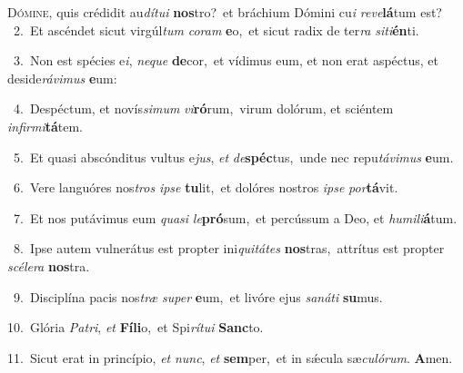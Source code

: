 \lettrine{\initial\textcolor{\initialcolor}{D}}{ómine,} quis crédidit au\-\textit{dí}\-\textit{tu}\textit{i} \textbf{nos}\-tro?~\star et bráchium Dómini cu\textit{i} \textit{re}\-\textit{ve}\textbf{lá}tum est?\\
{\numbfont\textcolor{\numbcolor}{~2.}}~Et ascéndet sicut virgúl\textit{tum} \textit{co}\-\textit{ram} \textbf{e}\-o,~\star et sicut radix de ter\textit{ra} \textit{si}\-\textit{ti}\textbf{én}ti.\par
{\numbfont\textcolor{\numbcolor}{~3.}}~Non est spécies e\-\textit{i}\-, \textit{ne}\-\textit{que} \textbf{de}\-cor,~\star et vídimus eum, et non erat aspéctus, et deside\-\textit{rá}\-\textit{vi}\textit{mus} \textbf{e}\-um:\par
{\numbfont\textcolor{\numbcolor}{~4.}}~Despéctum, et novís\-\textit{si}\-\textit{mum} \textit{vi}\-\textbf{ró}rum,~\star virum dolórum, et sciéntem \textit{in}\-\textit{fir}\textit{mi}\textbf{tá}tem.\par
{\numbfont\textcolor{\numbcolor}{~5.}}~Et quasi abscónditus vultus e\-\textit{jus}\-, \textit{et} \textit{de}\-\textbf{spéc}tus,~\star unde nec repu\-\textit{tá}\-\textit{vi}\textit{mus} \textbf{e}\-um.\par
{\numbfont\textcolor{\numbcolor}{~6.}}~Vere languóres nos\textit{tros} \textit{ip}\-\textit{se} \textbf{tu}\-lit,~\star et dolóres nostros \textit{ip}\-\textit{se} \textit{por}\-\textbf{tá}vit.\par
{\numbfont\textcolor{\numbcolor}{~7.}}~Et nos putávimus eum \textit{qua}\-\textit{si} \textit{le}\-\textbf{pró}sum,~\star et percússum a Deo, et \textit{hu}\-\textit{mi}\textit{li}\textbf{á}tum.\par
{\numbfont\textcolor{\numbcolor}{~8.}}~Ipse autem vulnerátus est propter ini\-\textit{qui}\-\textit{tá}\textit{tes} \textbf{nos}\-tras,~\star attrítus est propter \textit{scé}\-\textit{le}\textit{ra} \textbf{nos}\-tra.\par
{\numbfont\textcolor{\numbcolor}{~9.}}~Disciplína pacis nos\textit{træ} \textit{su}\-\textit{per} \textbf{e}\-um,~\star et livóre ejus \textit{sa}\-\textit{ná}\textit{ti} \textbf{su}\-mus.\par
{\numbfont\textcolor{\numbcolor}{10.}}~Glória \textit{Pa}\-\textit{tri}, \textit{et} \textbf{Fí}\-\textbf{li}o,~\star et Spi\-\textit{rí}\-\textit{tu}\textit{i} \textbf{Sanc}\-to.\par
{\numbfont\textcolor{\numbcolor}{11.}}~Sicut erat in princípio, \textit{et} \textit{nunc}\-, \textit{et} \textbf{sem}\-per,~\star et in sǽcula sæ\-\textit{cu}\-\textit{ló}\textit{rum}. \textbf{A}\-men.\par
